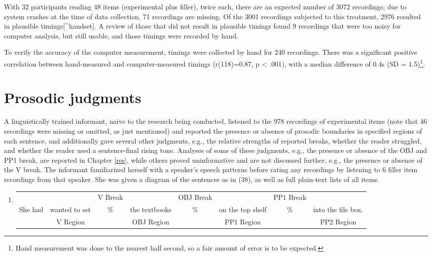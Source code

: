 \documentclass[11pt,oneside]{book}
\providecommand{\tightlist}{%
  \setlength{\itemsep}{0pt}\setlength{\parskip}{0pt}}
\let\rmarkdownfootnote\footnote%
\def\footnote{\protect\rmarkdownfootnote}
\begin{document}
With 32 participants reading 48 items (experimental plus filler), twice each, there are an expected number of 3072 recordings; due to system crashes at the time of data collection, 71 recordings are missing. Of the 3001 recordings subjected to this treatment, 2976 resulted in plausible timings{[}\^{}handset{]}. A review of those that did not result in plausible timings found 9 recordings that were too noisy for computer analysis, but still usable, and those timings were recorded by hand.

To verify the accuracy of the computer measurement, timings were collected by hand for 240 recordings. There was a significant positive correlation between hand-measured and computer-measured timings (r(118)=0.87, p \textless{} .001), with a median difference of 0.4s (SD = 1.5)\footnote{Hand measurement was done to the nearest half second, so a fair amount of error is to be expected.}.

\hypertarget{sita}{%
\section{Prosodic judgments}\label{sita}}

A linguistically trained informant, naive to the research being conducted, listened to the 978 recordings of experimental items (note that 46 recordings were missing or omitted, as just mentioned) and reported the presence or absence of prosodic boundaries in specified regions of each sentence, and additionally gave several other judgments, e.g., the relative strengths of reported breaks, whether the reader struggled, and whether the reader used a sentence-final rising tone. Analyses of some of these judgments, e.g., the presence or absence of the OBJ and PP1 break, are reported in Chapter \ref{res}, while others proved uninformative and are not discussed further, e.g., the presence or absence of the V break. The informant familiarized herself with a speaker's speech patterns before rating any recordings by listening to 6 filler item recordings from that speaker. She was given a diagram of the sentences as in (38), as well as full plain-text lists of all items.

\begin{enumerate}
\def\labelenumi{(\arabic{enumi})}
\setcounter{enumi}{37}
\tightlist
\item
  \begingroup
  \setlength{\tabcolsep}{1pt}

  \begin{tabular}{cccccccc}
    & & \footnotesize V Break & & \footnotesize OBJ Break & & \footnotesize PP1 Break & \\
    She had & wanted to set & \% & the textbooks & \% & on the top shelf & \% & into the file box. \\
    \cmidrule(r){2-2} \cmidrule(r){4-4} \cmidrule(r){6-6} \cmidrule(r){8-8} 
    & \footnotesize V Region & & \footnotesize OBJ Region & & \footnotesize PP1 Region & & PP2 Region \\
  \end{tabular}
    \endgroup
\end{enumerate}
\end{document}
